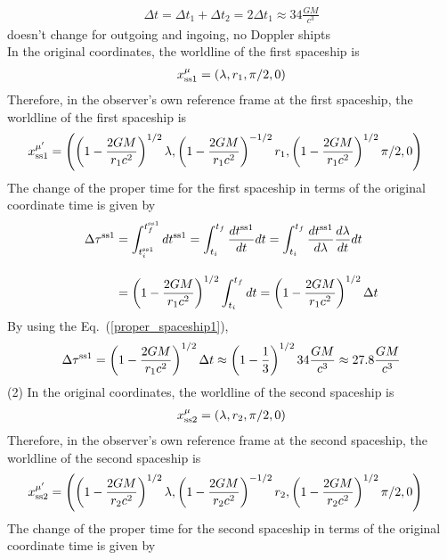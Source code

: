 \documentclass[12pt]{article}
\begin{document}
\begin{align*}
\Delta t = \Delta t_1 + \Delta t_2 = 2 \Delta t_1 \approx 34 \frac{G M}{c^3}
\end{align*}
{\color{red} doesn't change for outgoing and ingoing, no Doppler shipts}\\
In the original coordinates, the worldline of the first spaceship is
\begin{align*}
x^{\mu}_{\rm{ss}1} = \left(\lambda, r_1, \pi/2, 0 \right)
\end{align*}
Therefore, in the observer's own reference frame at the first spaceship, the worldline of the first spaceship is
\begin{align*}
&x^{\mu'}_{\rm{ss}1} = \left(\left(1 - \frac{2 G M}{r_1 c^2} \right)^{1/2} \lambda, \left(1 - \frac{2 G M}{r_1 c^2} \right)^{-1/2} r_1, \left(1 - \frac{2 G M}{r_1 c^2} \right)^{1/2} \pi/2, 0 \right)
\end{align*}
The change of the proper time for the first spaceship in terms of the original coordinate time is given by
\begin{align}
\Delta \tau^{\rm{ss}1} &= \int_{t^{\rm{ss}1}_{i}}^{t^{\rm{ss}1}_{f}} d t^{\rm{ss}1} = \int_{t_{i}}^{t_{f}} \frac{d t^{\rm{ss}1}}{d t} d t 
= \int_{t_{i}}^{t_{f}} \frac{d t^{\rm{ss}1}}{d \lambda} \frac{d \lambda}{d t} d t \nonumber\\[1em]
&= \left(1 - \frac{2 G M}{r_1 c^2} \right)^{1/2} \int_{t_{i}}^{t_{f}}  d t = \left(1 - \frac{2 G M}{r_1 c^2} \right)^{1/2} \Delta t
\label{proper_spaceship1}
\end{align}
By using the Eq.~(\ref{proper_spaceship1}),
\begin{align*}
\Delta \tau^{\rm{ss}1} = \left(1 - \frac{2 G M}{r_1 c^2} \right)^{1/2} \Delta t \approx \left(1 - \frac{1}{3} \right)^{1/2} 34 \frac{G M}{c^3} \approx 27.8 \frac{G M}{c^3}
\end{align*}
(2)
In the original coordinates, the worldline of the second spaceship is
\begin{align*}
x^{\mu}_{\rm{ss}2} = \left(\lambda, r_2, \pi/2, 0 \right) 
\end{align*}
Therefore, in the observer's own reference frame at the second spaceship, the worldline of the second spaceship is
\begin{align*}
&x^{\mu'}_{\rm{ss}2} = \left(\left(1 - \frac{2 G M}{r_2 c^2} \right)^{1/2} \lambda, \left(1 - \frac{2 G M}{r_2 c^2} \right)^{-1/2} r_2, \left(1 - \frac{2 G M}{r_2 c^2} \right)^{1/2} \pi/2, 0 \right)
\end{align*}
The change of the proper time for the second spaceship in terms of the original coordinate time is given by
\end{document}
